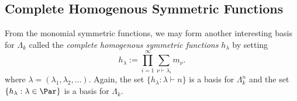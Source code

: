 \documentclass[12pt]{article}
\begin{document}
\subsection{Complete Homogenous Symmetric Functions}

From the monomial symmetric functions, we may form another interesting basis for $ \Lambda_{k} $ called the \textit{complete homogenous symmetric functions} $ h_{\lambda} $ by setting 
\[
  h_{\lambda}:=\prod_{i=1}^{\infty} \sum_{\nu\vdash \lambda_{i}} m_{\nu}.
\]
where $ \lambda = (\lambda_{1},\lambda_{2},\ldots) $. Again, the set $ \{h_{\lambda}: \lambda\vdash n\} $ is a basis for $ \Lambda_{k}^{n} $ and the set $ \{h_{\lambda}: \lambda\in\Par\} $ is a basis for $ \Lambda_{k} $.
\end{document}

